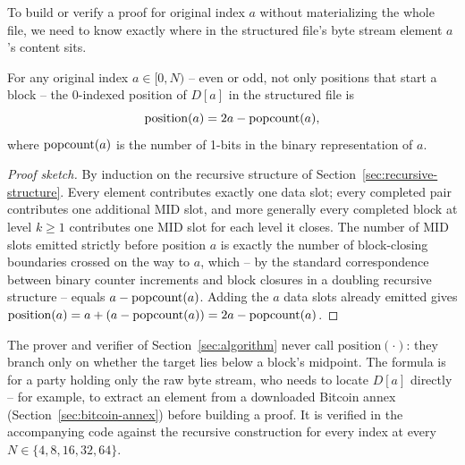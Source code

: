 To build or verify a proof for original index $a$ without materializing the
whole file, we need to know exactly where in the structured file's byte
stream element $a$'s content sits.

\begin{lemma}
\label{lem:position}
For any original index $a \in [0, N)$ -- even or odd, not only positions
that start a block -- the 0-indexed position of $D[a]$ in the structured
file is
\begin{equation}
\mathrm{position}(a) = 2a - \mathrm{popcount}(a),
\end{equation}
where $\mathrm{popcount}(a)$ is the number of 1-bits in the binary representation
of $a$.
\end{lemma}

\begin{proof}[Proof sketch]
By induction on the recursive structure of Section~\ref{sec:recursive-structure}.
Every element contributes exactly one data slot; every completed pair
contributes one additional $\mathrm{MID}$ slot, and more generally every
completed block at level $k \ge 1$ contributes one $\mathrm{MID}$ slot for
each level it closes. The number of $\mathrm{MID}$ slots emitted strictly
before position $a$ is exactly the number of block-closing boundaries
crossed on the way to $a$, which -- by the standard correspondence between
binary counter increments and block closures in a doubling recursive
structure -- equals $a - \mathrm{popcount}(a)$. Adding the $a$ data slots already
emitted gives $\mathrm{position}(a) = a + (a - \mathrm{popcount}(a)) = 2a -
\mathrm{popcount}(a)$.
\end{proof}

The prover and verifier of Section~\ref{sec:algorithm} never call
$\mathrm{position}(\cdot)$: they branch only on whether the target lies
below a block's midpoint. The formula is for a party holding only the raw
byte stream, who needs to locate $D[a]$ directly -- for example, to extract
an element from a downloaded Bitcoin annex (Section~\ref{sec:bitcoin-annex})
before building a proof. It is verified in the accompanying code against
the recursive construction for every index at every
$N \in \{4,8,16,32,64\}$.

